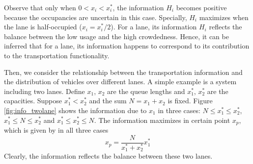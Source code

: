 \documentclass[preprint,authoryear,12pt]{elsarticle}
\begin{document}
Observe that only when $0<x_i<x_i^*$, the information $H_i$ becomes
positive because the occupancies are uncertain in this case.
Specially, $H_i$ maximizes when the lane is half-occupied
($x_i=x_i^*/2$). For a lane, its information $H_i$ reflects the
balance between the low usage and the high crowdedness. Hence, it can
be inferred that for a lane, its information happens to correspond to
its contribution to the transportation functionality.

Then, we consider the relationship between the transportation
information and the distribution of vehicles over different lanes. A
simple example is a system including two lanes. Define $x_1$, $x_2$
are the queue lengths and $x_1^*$, $x_2^*$ are the capacities.
Suppose $x_1^*<x_2^*$ and the sum $N=x_1+x_2$ is fixed. Figure
\ref{fig:info_twolane} shows the information due to $x_1$ in three
cases: $N\le x^*_1\le x^*_2$, $x^*_1\le N\le x^*_2$ and $x^*_1\le
x^*_2\le N$. The information maximizes in certain point $x_p$, which
is given by in all three cases
$$x_p = \frac{N}{x_1^*+x_2^*} x_1^*$$
Clearly, the information reflects the balance between these two
lanes.
\end{document}
